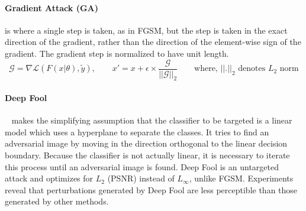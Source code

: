 \paragraph{Gradient Attack (GA)} is where a single step is taken, as in FGSM, but the step is taken in the exact direction of the gradient, rather than the direction of the element-wise sign of the gradient. The gradient step is normalized to have unit length.
\[
\mathcal{G} = \nabla \mathcal{L} (F(x|\theta),\widetilde{y}), \qquad x' = x + \epsilon \times \frac{\mathcal{G}}{\mathcal{||G||}_2} \qquad \text{where, $||.||_2$ denotes $L_2$ norm}
\]
\paragraph{Deep Fool} ~\cite{MoosaviDezfooli2016DeepFoolAS} makes the simplifying assumption that the classifier to be targeted is a linear model which uses a hyperplane to separate the classes.
It tries to find an adversarial image by moving in the direction orthogonal to the linear decision boundary. 
Because the classifier is not actually linear, it is necessary to iterate this process until an adversarial image is found.
Deep Fool is an untargeted attack and optimizes for $L_2$ (PSNR) instead of $L_\infty$, unlike FGSM. 
Experiments reveal that perturbations generated by Deep Fool are less perceptible than those generated by other methods.
